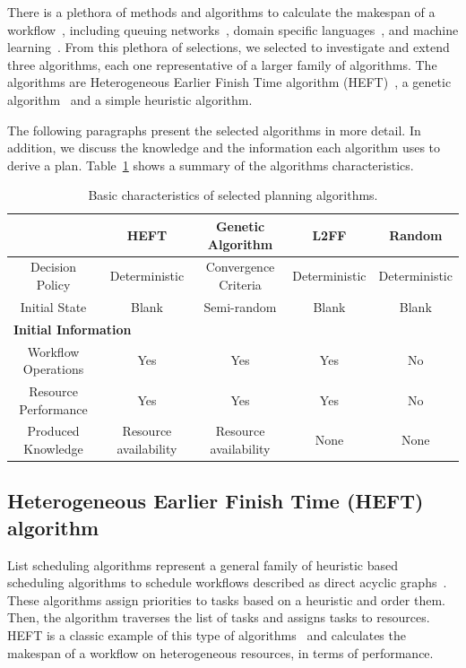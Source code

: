 There is a plethora of methods and algorithms to calculate the makespan of a workflow~\cite{lu2019review}, including queuing networks~\cite{yao2019throughput,bao2019performance}, domain specific languages~\cite{carothers2017durango,maheshwari2016workflow}, and machine learning~\cite{witt2019predictive,pumma2017runtime}.
From this plethora of selections, we selected to investigate and extend three algorithms, each one representative of a larger family of algorithms.
The algorithms are Heterogeneous Earlier Finish Time algorithm (HEFT)~\cite{topcuoglu2002performance}, a genetic algorithm~\cite{page2005algorithm} and a simple heuristic algorithm.

The following paragraphs present the selected algorithms in more detail.
In addition, we discuss the knowledge and the information each algorithm uses to derive a plan.
Table~\ref{tab:sched_algo} shows a summary of the algorithms characteristics.

\begin{table}[t]
    \centering
    \scriptsize
    \begin{tabular}{@{}ccccc@{}}
        \toprule
        &\textbf{HEFT}     &\textbf{Genetic Algorithm} &\textbf{L2FF} & \textbf{Random} \\
        \midrule
        Decision Policy   &Deterministic &Convergence Criteria &Deterministic& Deterministic\\
        Initial State    &Blank &Semi-random &Blank & Blank\\
        \midrule
        \multicolumn{5}{l}{\textbf{Initial Information}}\\\midrule
        Workflow Operations &Yes & Yes & Yes & No\\
        Resource Performance &Yes &Yes &Yes & No\\
        \midrule
        Produced Knowledge& Resource availability& Resource availability&None&None\\
        \bottomrule
    \end{tabular}
    \caption{Basic characteristics of selected planning algorithms.\label{tab:sched_algo}}
\end{table}

\subsection{Heterogeneous Earlier Finish Time (HEFT) algorithm}
\label{algo:heft}
List scheduling algorithms represent a general family of heuristic based scheduling algorithms to schedule workflows described as direct acyclic graphs~\cite{dong2006scheduling,list_sched_wiki}. 
These algorithms assign priorities to tasks based on a heuristic and order them.
Then, the algorithm traverses the list of tasks and assigns tasks to resources.
HEFT is a classic example of this type of algorithms~\cite{dong2006scheduling} and calculates the makespan of a workflow on heterogeneous resources, in terms of performance.

